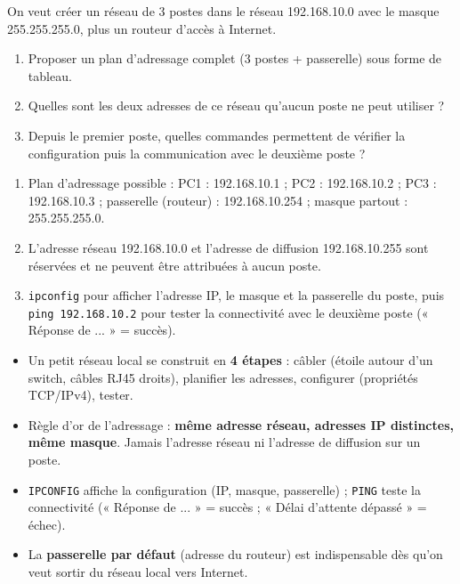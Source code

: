 \documentclass[11pt]{article}
\begin{document}
\begin{exercice}
On veut créer un réseau de 3 postes dans le réseau 192.168.10.0 avec le masque 255.255.255.0, plus un routeur d'accès à Internet.
\begin{enumerate}
\item Proposer un plan d'adressage complet (3 postes + passerelle) sous forme de tableau.
\item Quelles sont les deux adresses de ce réseau qu'aucun poste ne peut utiliser ?
\item Depuis le premier poste, quelles commandes permettent de vérifier la configuration puis la communication avec le deuxième poste ?
\end{enumerate}
\end{exercice}

\begin{corrige}[Exercice 1]
\begin{enumerate}
\item Plan d'adressage possible : PC1 : 192.168.10.1 ; PC2 : 192.168.10.2 ; PC3 : 192.168.10.3 ; passerelle (routeur) : 192.168.10.254 ; masque partout : 255.255.255.0.
\item L'adresse réseau 192.168.10.0 et l'adresse de diffusion 192.168.10.255 sont réservées et ne peuvent être attribuées à aucun poste.
\item \texttt{ipconfig} pour afficher l'adresse IP, le masque et la passerelle du poste, puis \texttt{ping 192.168.10.2} pour tester la connectivité avec le deuxième poste (« Réponse de ... » = succès).
\end{enumerate}
\end{corrige}

\begin{aretenir}
\begin{itemize}
\item Un petit réseau local se construit en \textbf{4 étapes} : câbler (étoile autour d'un switch, câbles RJ45 droits), planifier les adresses, configurer (propriétés TCP/IPv4), tester.
\item Règle d'or de l'adressage : \textbf{même adresse réseau, adresses IP distinctes, même masque}. Jamais l'adresse réseau ni l'adresse de diffusion sur un poste.
\item \texttt{IPCONFIG} affiche la configuration (IP, masque, passerelle) ; \texttt{PING} teste la connectivité (« Réponse de ... » = succès ; « Délai d'attente dépassé » = échec).
\item La \textbf{passerelle par défaut} (adresse du routeur) est indispensable dès qu'on veut sortir du réseau local vers Internet.
\end{itemize}
\end{aretenir}
\end{document}
